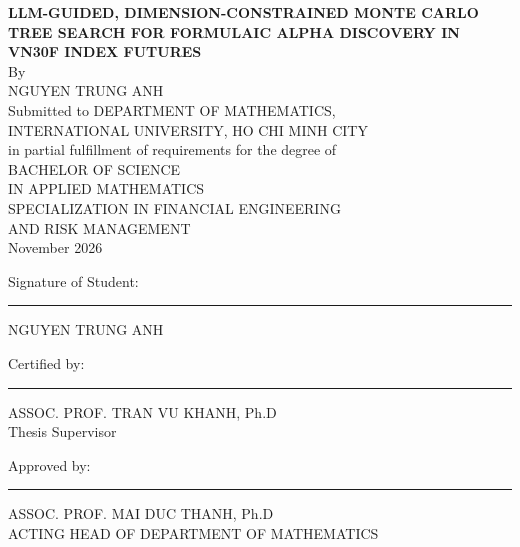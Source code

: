 \documentclass[12pt,a4paper,oneside]{book}
\theoremstyle{definition}
\newcommand{\thesistitle}{LLM-GUIDED, DIMENSION-CONSTRAINED MONTE CARLO TREE SEARCH FOR FORMULAIC ALPHA DISCOVERY IN VN30F INDEX FUTURES}
\newcommand{\studentname}{NGUYEN TRUNG ANH}
\newcommand{\supervisor}{ASSOC. PROF. TRAN VU KHANH, Ph.D}
\newcommand{\thesisdate}{November 2026}
\begin{document}
\begin{titlepage}
		\newpage
		\thispagestyle{empty}
		\begin{center}
			\large\textbf{\thesistitle} \\
			\normalsize{By}\\
			\large{\studentname}\\
			\vskip10mm
			\normalsize{Submitted to DEPARTMENT OF MATHEMATICS,\\INTERNATIONAL UNIVERSITY, HO CHI MINH CITY\\ in partial fulfillment of requirements for the degree of\\
				BACHELOR OF SCIENCE \\
				IN APPLIED MATHEMATICS \\
				SPECIALIZATION IN FINANCIAL ENGINEERING  \\
				AND RISK MANAGEMENT}\\
			\thesisdate
			\vskip30mm
		\end{center}
        Signature of Student:
        \rule[0em]{26.7em}{0.5pt}
            \begin{flushright}\studentname \end{flushright}
		\vskip10mm
		Certified by: \rule[0em]{30em}{0.5pt}
		\begin{flushright} \supervisor\\ Thesis Supervisor
		\end{flushright}
		\vskip10mm
		Approved by:
        \rule[0em]{30em}{0.5pt}
        \begin{flushright} ASSOC. PROF. MAI DUC THANH, Ph.D\\ ACTING HEAD OF DEPARTMENT OF MATHEMATICS
        \end{flushright}
	\end{titlepage}
\end{document}
